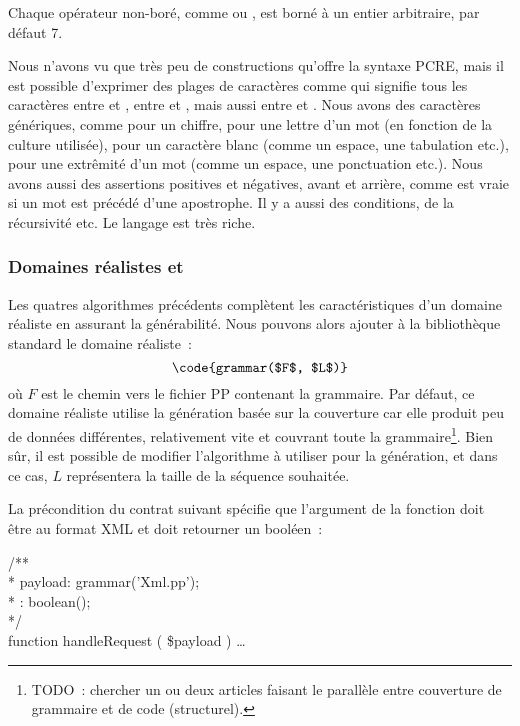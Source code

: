 Chaque opérateur non-boré, comme \code{*} ou \code{+}, est borné à un entier
arbitraire, par défaut 7.

Nous n'avons vu que très peu de constructions qu'offre la syntaxe PCRE, mais il
est possible d'exprimer des plages de caractères comme \code{[a-zA-Z0-9]} qui
signifie tous les caractères entre  et , entre  et
, mais aussi entre  et . Nous avons des caractères
génériques, comme  pour un chiffre,  pour une
lettre d'un mot (en fonction de la culture utilisée),  pour un
caractère blanc (comme un espace, une tabulation etc.),  pour
une extrêmité d'un mot (comme un espace, une ponctuation etc.). Nous avons aussi
des assertions positives et négatives, avant et arrière, comme
 est vraie si un mot est précédé d'une apostrophe. Il
y a aussi des conditions, de la récursivité etc. Le langage est très riche.

\subsubsection{Domaines réalistes  et }

Les quatres algorithmes précédents complètent les caractéristiques d'un domaine
réaliste en assurant la générabilité. Nous pouvons alors ajouter à la
bibliothèque standard le domaine réaliste~:
%
$$\code{grammar($F$, $L$)}$$
%
où $F$ est le chemin vers le fichier PP contenant la grammaire. Par défaut, ce
domaine réaliste utilise la génération basée sur la couverture car elle produit
peu de données différentes, relativement vite et couvrant toute la
grammaire\footnote{TODO~: chercher un ou deux articles faisant le parallèle
entre couverture de grammaire et de code (structurel).}. Bien sûr, il est
possible de modifier l'algorithme à utiliser pour la génération, et dans ce cas,
$L$ représentera la taille de la séquence souhaitée.

\begin{example}

La précondition du contrat suivant spécifie que l'argument  de
la fonction  doit être au format XML et doit retourner
un booléen~:

\begin{pre}
/** \\
 * \arequires payload: grammar('Xml.pp'); \\
 * \aensures  \aresult: boolean(); \\
 */ \\
function handleRequest ( \$payload ) { … }
\end{pre}

\end{example}

